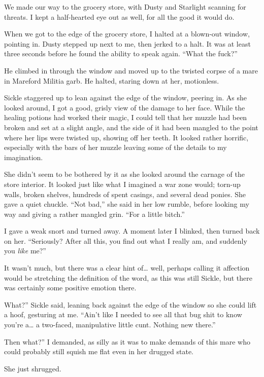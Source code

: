 We made our way to the grocery store, with Dusty and Starlight scanning for threats. I kept a half-hearted eye out as well, for all the good it would do.

When we got to the edge of the grocery store, I halted at a blown-out window, pointing in. Dusty stepped up next to me, then jerked to a halt. It was at least three seconds before he found the ability to speak again. “What the fuck?”

He climbed in through the window and moved up to the twisted corpse of a mare in Mareford Militia garb. He halted, staring down at her, motionless.

Sickle staggered up to lean against the edge of the window, peering in. As she looked around, I got a good, grisly view of the damage to her face. While the healing potions had worked their magic, I could tell that her muzzle had been broken and set at a slight angle, and the side of it had been mangled to the point where her lips were twisted up, showing off her teeth. It looked rather horrific, especially with the bars of her muzzle leaving some of the details to my imagination.

She didn’t seem to be bothered by it as she looked around the carnage of the store interior. It looked just like what I imagined a war zone would; torn-up walls, broken shelves, hundreds of spent casings, and several dead ponies. She gave a quiet chuckle. “Not bad,” she said in her low rumble, before looking my way and giving a rather mangled grin. “For a little bitch.”

I gave a weak snort and turned away. A moment later I blinked, then turned back on her. “Seriously? After all this, you find out what I really am, and suddenly you \textit{like} me?”

It wasn’t much, but there was a clear hint of… well, perhaps calling it affection would be stretching the definition of the word, as this was still Sickle, but there was certainly some positive emotion there.

\leavevmode{}What?” Sickle said, leaning back against the edge of the window so she could lift a hoof, gesturing at me. “Ain’t like I needed to see all that bug shit to know you’re a… a two-faced, manipulative little cunt. Nothing new there.”

\leavevmode{}Then what?” I demanded, as silly as it was to make demands of this mare who could probably still squish me flat even in her drugged state.

She just shrugged.

